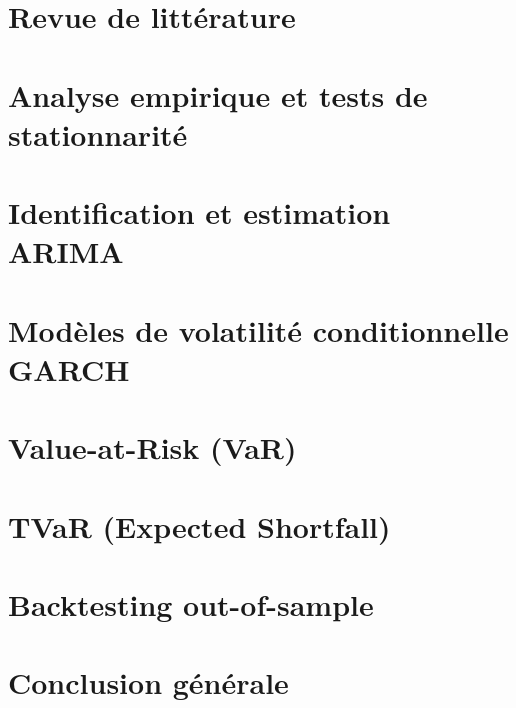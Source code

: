 ﻿\documentclass[a4paper,12pt]{article}
\begin{document}
\section{Revue de litt\'{e}rature}

\newpage

\section{Analyse empirique et tests de stationnarit\'{e}}

\newpage

\section{Identification et estimation ARIMA}


\newpage

\section{Mod\`{e}les de volatilit\'{e} conditionnelle GARCH}


\newpage

\section{Value-at-Risk (VaR)}


\newpage

\section{TVaR (Expected Shortfall)}

\newpage

\section{Backtesting out-of-sample}


\newpage

\section{Conclusion g\'{e}n\'{e}rale}

\newpage




\end{document}
